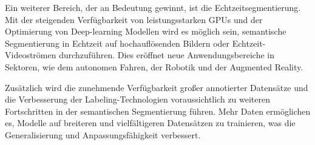 Ein weiterer Bereich, der an Bedeutung gewinnt, ist die Echtzeitsegmentierung.
Mit der steigenden Verfügbarkeit von leistungsstarken GPUs und der Optimierung
von Deep-learning Modellen wird es möglich sein, semantische Segmentierung in
Echtzeit auf hochauflösenden Bildern oder Echtzeit-Videoströmen
durchzuführen. Dies eröffnet neue Anwendungsbereiche in Sektoren, wie dem autonomen
Fahren, der Robotik und der Augmented Reality. \cite{zhao2017pyramid}

Zusätzlich wird die zunehmende Verfügbarkeit großer
annotierter Datensätze und die Verbesserung der Labeling-Technologien
voraussichtlich zu weiteren Fortschritten in der semantischen Segmentierung
führen. Mehr Daten ermöglichen es, Modelle auf breiteren und vielfältigeren
Datensätzen zu trainieren, was die Generalisierung und Anpassungsfähigkeit
verbessert. \cite{cordts2016cityscapes}